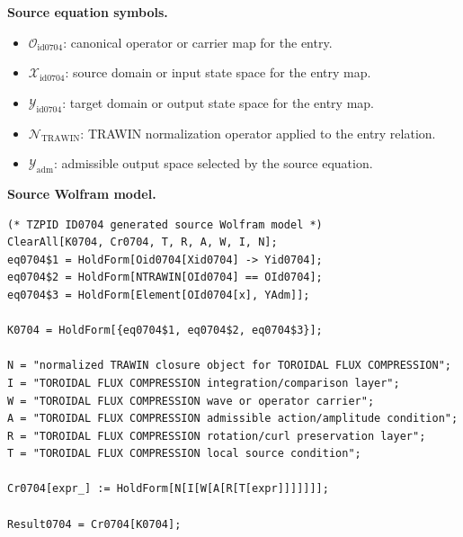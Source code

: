 \begin{minipage}[t]{0.49\linewidth}
\begingroup
\small
\raggedright
\textbf{Source equation symbols.}\par
\begin{itemize}[leftmargin=1.35em,itemsep=1pt,topsep=1pt,parsep=0pt]
    \item $\mathcal{O}_{\mathrm{id0704}}$: canonical operator or carrier map for the entry.
    \item $\mathcal{X}_{\mathrm{id0704}}$: source domain or input state space for the entry map.
    \item $\mathcal{Y}_{\mathrm{id0704}}$: target domain or output state space for the entry map.
    \item $\mathcal{N}_{\mathrm{TRAWIN}}$: TRAWIN normalization operator applied to the entry relation.
    \item $\mathcal{Y}_{\mathrm{adm}}$: admissible output space selected by the source equation.
\end{itemize}
\endgroup
\end{minipage}\hfill
\begin{minipage}[t]{0.47\linewidth}
\begingroup
\scriptsize
\raggedright
\textbf{Source Wolfram model.}\par
\begin{Verbatim}[fontsize=\tiny,breaklines=true,breakanywhere=true]
(* TZPID ID0704 generated source Wolfram model *)
ClearAll[K0704, Cr0704, T, R, A, W, I, N];
eq0704$1 = HoldForm[Oid0704[Xid0704] -> Yid0704];
eq0704$2 = HoldForm[NTRAWIN[OId0704] == OId0704];
eq0704$3 = HoldForm[Element[OId0704[x], YAdm]];

K0704 = HoldForm[{eq0704$1, eq0704$2, eq0704$3}];

N = "normalized TRAWIN closure object for TOROIDAL FLUX COMPRESSION";
I = "TOROIDAL FLUX COMPRESSION integration/comparison layer";
W = "TOROIDAL FLUX COMPRESSION wave or operator carrier";
A = "TOROIDAL FLUX COMPRESSION admissible action/amplitude condition";
R = "TOROIDAL FLUX COMPRESSION rotation/curl preservation layer";
T = "TOROIDAL FLUX COMPRESSION local source condition";

Cr0704[expr_] := HoldForm[N[I[W[A[R[T[expr]]]]]]];

Result0704 = Cr0704[K0704];
\end{Verbatim}
\endgroup
\end{minipage}

